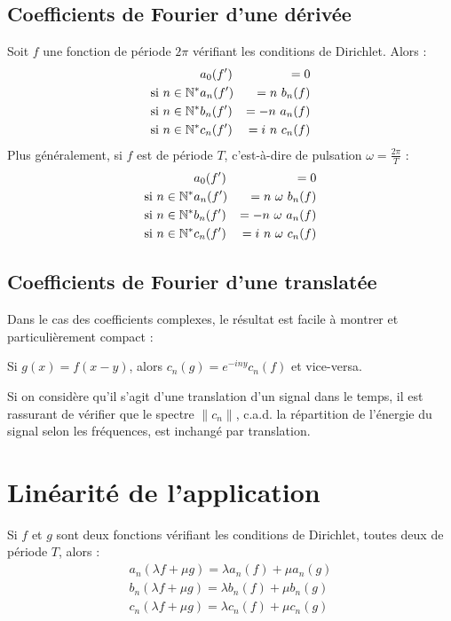 \subsection{Coefficients de Fourier d'une dérivée}
Soit $f$ une fonction de période $2\pi$ vérifiant les conditions de Dirichlet.
Alors : 
\begin{eqnarray}
& a_0(f')&=0 \label{eqderivee}\\
\text{si~} n\in \mathbb{N}^* & a_n(f')&=n~b_n(f) \\
\text{si~} n\in \mathbb{N}^* & b_n(f')&=-n~a_n(f) \\
\text{si~} n\in \mathbb{N}^* & c_n(f')&=i~n~c_n(f)
\end{eqnarray}
Plus généralement, si $f$ est de période $T$, c'est-à-dire de
pulsation $\omega=\frac{2\pi}{T}$ :
\begin{eqnarray}
& a_0(f')&=0 \\
\text{si~}n\in \mathbb{N}^* & a_n(f')&=n~\omega~b_n(f) \\
\text{si~}n\in \mathbb{N}^* & b_n(f')&=-n~\omega~a_n(f) \\
\text{si~}n\in \mathbb{N}^* & c_n(f')&=i~n~\omega~c_n(f)
\end{eqnarray}

\subsection{Coefficients de Fourier d'une translatée}

Dans le cas des coefficients complexes, le résultat est facile à
montrer et particulièrement compact :

Si $g(x)=f(x-y)$, alors $c_n(g)=e^{-iny}c_n(f)$ et vice-versa.

Si on considère qu'il s'agit d'une translation d'un signal dans le temps, il est rassurant de vérifier que le spectre $\|c_n\|$, c.a.d. la répartition de l'énergie du signal selon les fréquences, est inchangé par translation. 


\section{Linéarité de l'application}

Si $f$ et $g$ sont deux fonctions vérifiant les conditions de
Dirichlet, toutes deux de période $T$, alors :
\begin{eqnarray}
a_n(\lambda f+\mu g)=\lambda a_n(f)  + \mu a_n (g) \\
b_n(\lambda f+\mu g)=\lambda b_n(f)  + \mu b_n (g) \\
c_n(\lambda f+\mu g)=\lambda c_n(f)  + \mu c_n (g)
\end{eqnarray}

